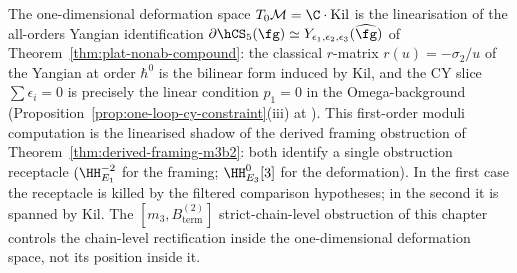 \begin{remark}
\label{rem:plat-first-order-moduli-match}
The one-dimensional deformation space $T_0 \mathcal{M} = \C \cdot \mathrm{Kil}$
is the linearisation of the all-orders
Yangian identification $\partial\hCS_5(\fg) \simeq
Y_{\epsilon_1, \epsilon_2, \epsilon_3}(\widehat\fg)$ of
Theorem~\ref{thm:plat-nonab-compound}: the classical $r$-matrix
$r(u) = -\sigma_2/u$ of the Yangian at order $\hbar^0$ is the
bilinear form induced by $\mathrm{Kil}$, and the CY slice $\sum
\epsilon_i = 0$ is precisely the linear condition
$p_1 = 0$ in the Omega-background
(Proposition~\ref{prop:one-loop-cy-constraint}(iii) at
\cite{VolI}). This
first-order moduli computation is the linearised shadow of the
derived framing obstruction of
Theorem~\ref{thm:derived-framing-m3b2}: both identify a single
obstruction receptacle $(\HH^{-2}_{E_1}$ for the framing;
$\HH^0_{E_3}[3]$ for the deformation).  In the first case the
receptacle is killed by the filtered comparison hypotheses; in
the second it is spanned by $\mathrm{Kil}$. The
$[m_3, B^{(2)}_{\mathrm{term}}]$
strict-chain-level obstruction of this chapter controls the
chain-level rectification inside the one-dimensional deformation
space, not its position inside it.
\end{remark}

